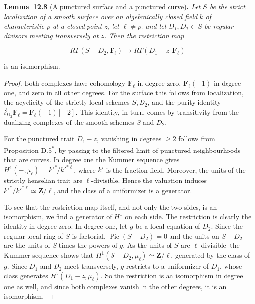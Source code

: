 \documentclass[11pt]{article}
\newenvironment{bpstatement}[2]{\par\addvspace{0.6\baselineskip}\noindent\textbf{#1}#2\textbf{.}\enspace\ignorespaces}
  {\par\addvspace{0.4\baselineskip}}
\newenvironment{bpstatementit}[2]{\begin{bpstatement}{#1}{#2}\itshape\ignorespaces}{\end{bpstatement}}
\newcommand{\bpout}[1]{#1\textsuperscript{\hyperlink{bp-outside}{\ensuremath{\ast}}}}
\begin{document}
\label{bp251}%
\begin{bpstatementit}{Lemma~12.8}{ (A punctured surface and a punctured curve)}
Let \(S\) be the strict localization of a smooth surface over an algebraically closed field \(k\) of characteristic \(p\) at a closed point \(z\), let \(\ell\neq p\), and let \(D_1,D_2\subset S\) be regular divisors meeting transversely at \(z\). Then the restriction map

\[
R\Gamma(S-D_2,\mathbf F_\ell)\longrightarrow R\Gamma(D_1-z,\mathbf F_\ell)
\]

is an isomorphism.
\end{bpstatementit}

\begin{proof}[{Proof}]\label{bp252}%
Both complexes have cohomology \(\mathbf F_\ell\) in degree zero, \(\mathbf F_\ell(-1)\) in degree one, and zero in all other degrees. For the surface this follows from localization, the acyclicity of the strictly local schemes \(S,D_2\), and the purity identity \(i_{D_2}^!\mathbf F_\ell=\mathbf F_\ell(-1)[-2]\). This identity, in turn, comes by transitivity from the dualizing complexes of the smooth schemes \(S\) and \(D_2\).

For the punctured trait \(D_1-z\), vanishing in degrees \(\geq2\) follows from Proposition \bpout{D.5}, by passing to the filtered limit of punctured neighbourhoods that are curves. In degree one the Kummer sequence gives \(H^1(-,\mu_\ell)=k'^*/k'^{*\ell}\), where \(k'\) is the fraction field. Moreover, the units of the strictly henselian trait are \(\ell\)-divisible. Hence the valuation induces \(k'^*/k'^{*\ell}\simeq\mathbf Z/\ell\), and the class of a uniformizer is a generator.

To see that the restriction map itself, and not only the two sides, is an isomorphism, we find a generator of \(H^1\) on each side. The restriction is clearly the identity in degree zero. In degree one, let \(g\) be a local equation of \(D_2\). Since the regular local ring of \(S\) is factorial, \(\operatorname{Pic}(S-D_2)=0\) and the units on \(S-D_2\) are the units of \(S\) times the powers of \(g\). As the units of \(S\) are \(\ell\)-divisible, the Kummer sequence shows that \(H^1(S-D_2,\mu_\ell)\simeq\mathbf Z/\ell\), generated by the class of \(g\). Since \(D_1\) and \(D_2\) meet transversely, \(g\) restricts to a uniformizer of \(D_1\), whose class generates \(H^1(D_1-z,\mu_\ell)\). So the restriction is an isomorphism in degree one as well, and since both complexes vanish in the other degrees, it is an isomorphism.
\end{proof}
\end{document}
